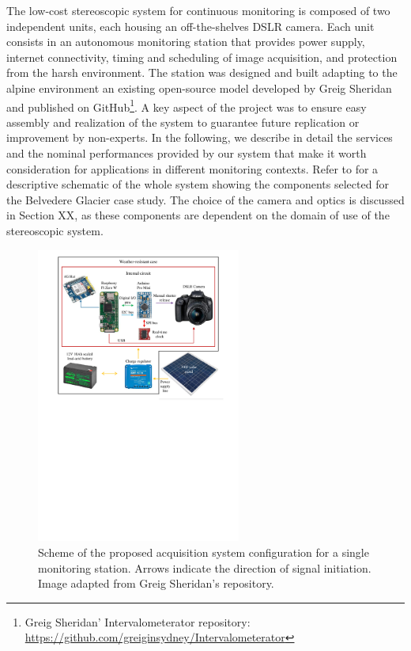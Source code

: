 The low-cost stereoscopic system for continuous monitoring is composed of two independent
units, each housing an off-the-shelves DSLR camera.
Each unit consists in an autonomous monitoring station that provides power supply,
internet connectivity, timing and scheduling of image acquisition, and protection from
the harsh environment.
The station was designed and built adapting to the alpine environment an existing
open-source model developed by Greig Sheridan and published on
GitHub\footnote{\label{foot:greig}Greig Sheridan' Intervalometerator repository:
  \url{https://github.com/greiginsydney/Intervalometerator}}.
A key aspect of the project was to ensure easy assembly and realization of the system to
guarantee future replication or improvement by non-experts.
In the following, we describe in detail the services and the
nominal performances provided by our system that make it worth consideration for
applications in different monitoring contexts. Refer to  for
a descriptive schematic of the whole system showing the components selected for the
Belvedere Glacier case study. The choice of the camera and optics is discussed in Section
XX, as these components are dependent on the domain of use of the
stereoscopic system.

\begin{figure}[h!]
  \centering
  \includegraphics[width=0.6\textwidth]{schema.pdf}
  \caption{Scheme of the proposed acquisition system configuration for a single
    monitoring station. Arrows indicate the direction of signal initiation. Image adapted
    from Greig Sheridan's repository.}
  \label{fig:scheme_foto}
\end{figure}

